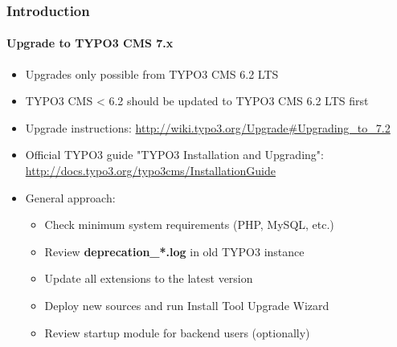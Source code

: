 \begin{frame}[fragile]
	\frametitle{Introduction}
	\framesubtitle{Upgrade to TYPO3 CMS 7.x}

	\begin{itemize}
		\item Upgrades only possible from TYPO3 CMS 6.2 LTS
		\item TYPO3 CMS < 6.2 should be updated to TYPO3 CMS 6.2 LTS first
	\end{itemize}

	\begin{itemize}

		\item Upgrade instructions:\newline
			\smaller\url{http://wiki.typo3.org/Upgrade#Upgrading_to_7.2}\normalsize
		\item Official TYPO3 guide "TYPO3 Installation and Upgrading":
			\smaller\url{http://docs.typo3.org/typo3cms/InstallationGuide}\normalsize
		\item General approach:
			\begin{itemize}
				\item Check minimum system requirements \small(PHP, MySQL, etc.)
				\item Review \textbf{deprecation\_*.log} in old TYPO3 instance
				\item Update all extensions to the latest version
				\item Deploy new sources and run Install Tool \textrightarrow Upgrade Wizard
				\item Review startup module for backend users (optionally)
			\end{itemize}
	\end{itemize}

\end{frame}

